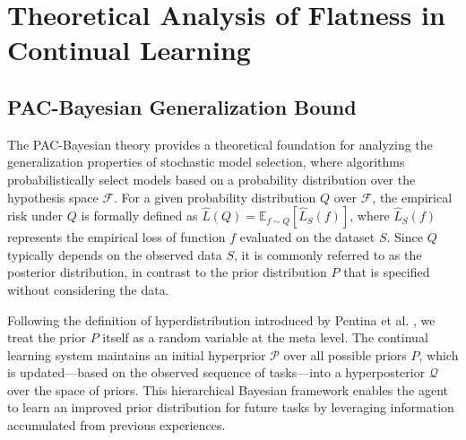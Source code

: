 \documentclass[letterpaper]{article} %
\begin{document}
\section{Theoretical Analysis of Flatness in Continual Learning}

\subsection{PAC-Bayesian Generalization Bound}


The PAC-Bayesian theory provides a theoretical foundation for analyzing the generalization properties of stochastic model selection, where algorithms probabilistically select models based on a probability distribution over the hypothesis space \(\mathcal{F}\). For a given probability distribution \(Q\) over \(\mathcal{F}\), the empirical risk under \(Q\) is formally defined as \(\hat{L}(Q) = \mathbb{E}_{f \sim Q}[\hat{L}_S(f)]\), where \(\hat{L}_S(f)\) represents the empirical loss of function \(f\) evaluated on the dataset \(S\). Since \(Q\) typically depends on the observed data \(S\), it is commonly referred to as the posterior distribution, in contrast to the prior distribution \(P\) that is specified without considering the data. 

Following the definition of hyperdistribution introduced by Pentina et al. , we treat the prior $P$ itself as a random variable at the meta level. The continual learning system maintains an initial hyperprior $\mathcal{P}$ over all possible priors $P$, which is updated—based on the observed sequence of tasks—into a hyperposterior $\mathcal{Q}$ over the space of priors. This hierarchical Bayesian framework enables the agent to learn an improved prior distribution for future tasks by leveraging information accumulated from previous experiences. 
\end{document}
